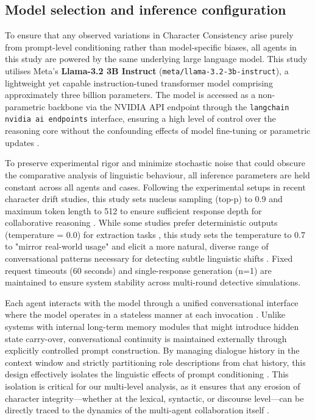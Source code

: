 \documentclass{article}
\begin{document}
\subsection{Model selection and inference configuration}

To ensure that any observed variations in Character Consistency arise purely from prompt-level conditioning rather than model-specific biases, all agents in this study are powered by the same underlying large language model. This study utilises Meta’s \textbf{Llama-3.2 3B Instruct} (\texttt{meta/llama-3.2-3b-instruct}), a lightweight yet capable instruction-tuned transformer model comprising approximately three billion parameters. The model is accessed as a non-parametric backbone via the NVIDIA API endpoint through the \texttt{langchain nvidia ai endpoints} interface, ensuring a high level of control over the reasoning core without the confounding effects of model fine-tuning or parametric updates
\citep{shao2023characterllm}.

To preserve experimental rigor and minimize stochastic noise that could obscure the comparative analysis of linguistic behaviour, all inference parameters are held constant across all agents and cases. Following the experimental setups in recent character drift studies, this study sets nucleus sampling (top-p) to 0.9 and maximum token length to 512 to ensure sufficient response depth for collaborative reasoning \citep{choi2024examining}. While some studies prefer deterministic outputs (temperature = 0.0) for extraction tasks \citep{delima2025detective}, this study sets the temperature to 0.7 to "mirror real-world usage" and elicit a more natural, diverse range of conversational patterns necessary for detecting subtle linguistic shifts \citep{choi2024examining}. Fixed request timeouts (60 seconds) and single-response generation (n=1) are maintained to ensure system stability across multi-round detective simulations.

Each agent interacts with the model through a unified conversational interface where the model operates in a stateless manner at each invocation \citep{park2023generative, guo2026collab}
. Unlike systems with internal long-term memory modules that might introduce hidden state carry-over, conversational continuity is maintained externally through explicitly controlled prompt construction. By managing dialogue history in the context window and strictly partitioning role descriptions from chat history, this design effectively isolates the linguistic effects of prompt conditioning \citep{delima2025detective}. This isolation is critical for our multi-level analysis, as it ensures that any erosion of character integrity—whether at the lexical, syntactic, or discourse level—can be directly traced to the dynamics of the multi-agent collaboration itself \citep{choi2024examining, guo2026collab}.
\end{document}
